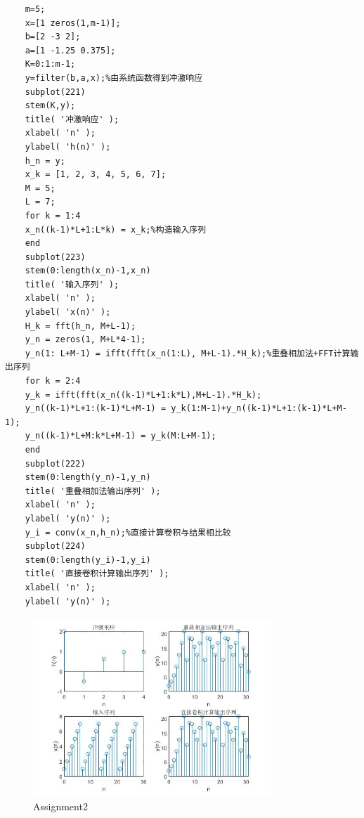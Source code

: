 \documentclass{seuer}
\begin{document}
\begin{lstlisting}
	m=5;
	x=[1 zeros(1,m-1)];
	b=[2 -3 2];
	a=[1 -1.25 0.375];
	K=0:1:m-1;
	y=filter(b,a,x);%由系统函数得到冲激响应
	subplot(221)
	stem(K,y);
	title( '冲激响应' );
	xlabel( 'n' );
	ylabel( 'h(n)' );
	h_n = y;
	x_k = [1, 2, 3, 4, 5, 6, 7];
	M = 5;
	L = 7;
	for k = 1:4
	x_n((k-1)*L+1:L*k) = x_k;%构造输入序列
	end
	subplot(223)
	stem(0:length(x_n)-1,x_n)
	title( '输入序列' );
	xlabel( 'n' );
	ylabel( 'x(n)' );
	H_k = fft(h_n, M+L-1);
	y_n = zeros(1, M+L*4-1);
	y_n(1: L+M-1) = ifft(fft(x_n(1:L), M+L-1).*H_k);%重叠相加法+FFT计算输出序列
	for k = 2:4
	y_k = ifft(fft(x_n((k-1)*L+1:k*L),M+L-1).*H_k);
	y_n((k-1)*L+1:(k-1)*L+M-1) = y_k(1:M-1)+y_n((k-1)*L+1:(k-1)*L+M-1);
	y_n((k-1)*L+M:k*L+M-1) = y_k(M:L+M-1);
	end
	subplot(222)
	stem(0:length(y_n)-1,y_n)
	title( '重叠相加法输出序列' );
	xlabel( 'n' );
	ylabel( 'y(n)' );
	y_i = conv(x_n,h_n);%直接计算卷积与结果相比较
	subplot(224)
	stem(0:length(y_i)-1,y_i)
	title( '直接卷积计算输出序列' );
	xlabel( 'n' );
	ylabel( 'y(n)' );
\end{lstlisting}
\begin{figure}[H] %
	\centering %
	\includegraphics[width=0.8\textwidth]{"../DSPAssignment/Assignment2.jpg"} %
	\caption{Assignment2} %
	\label{Fig2} %
\end{figure}
\end{document}
